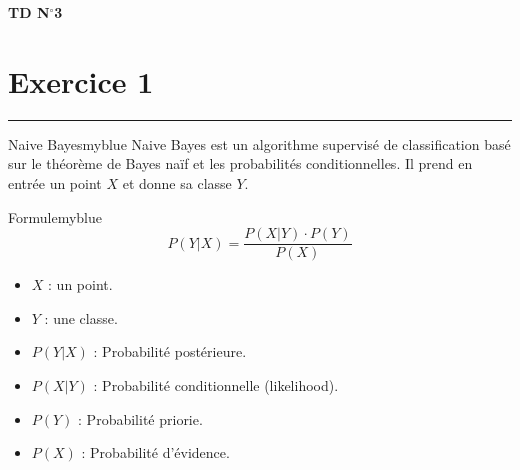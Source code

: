 \documentclass{article}
\newcommand{\exer}[1]{
  \section*{Exercice #1}
  \vspace{-0.5cm}
  \noindent\rule{\textwidth}{0.5pt}%
}
\newcommand{\tit}[1]{
\begin{center}
    \Large{\textbf{{#1}}}
\end{center}
}
\begin{document}
\tit{TD N\(^{\boldsymbol{\circ}}\)\hspace{0.1cm}3}
\exer{1}

\vspace{0.25cm}


\begin{prettyBox}{Naive Bayes}{myblue}
    Naive Bayes est un algorithme supervisé de classification basé sur le théorème de 
    Bayes naïf et les probabilités conditionnelles. Il prend en entrée un point $X$ et donne
    sa classe $Y$.
\end{prettyBox}

\vspace{0.25cm}


\begin{prettyBox}{Formule}{myblue}
\[ P(Y|X) = \dfrac{P(X|Y) \cdot P(Y)}{P(X)} \] 

\begin{itemize}
    \setlength{\itemsep}{0pt}
    \item $X$ : un point.
    \item $Y$ : une classe.
    \item $P(Y|X)$ : Probabilité postérieure.
    \item $P(X|Y)$ : Probabilité conditionnelle (likelihood).
    \item $P(Y)$ : Probabilité priorie.
    \item $P(X)$ : Probabilité d'évidence.
\end{itemize}
\end{prettyBox}

\vspace{0.25cm}
\end{document}
